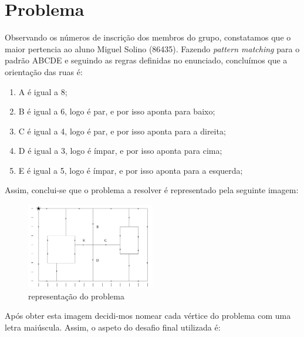 \documentclass[a4paper]{report}
\begin{document}
\chapter{Problema}
Observando os números de inscrição dos membros do grupo, constatamos
que o maior pertencia ao aluno Miguel Solino (86435).
Fazendo \textit{pattern matching} para o padrão ABCDE e seguindo as
regras definidas no enunciado, concluímos que a orientação das ruas é:

\begin{enumerate}
    \item A é igual a 8;
    \item B é igual a 6, logo é par, e por isso aponta para baixo;
    \item C é igual a 4, logo é par, e por isso aponta para a direita;
    \item D é igual a 3, logo é ímpar, e por isso aponta para cima;
    \item E é igual a 5, logo é ímpar, e por isso aponta para a 
        esquerda;
\end{enumerate}
Assim, conclui-se que o problema a resolver é representado pela
seguinte imagem:

\begin{figure}[H]
    \begin{center}
        \includegraphics[width=0.5\textwidth]{images/desafio.png}\par
        \caption{representação do problema}
        \label{fig:problem}
    \end{center}
\end{figure}
Após obter esta imagem decidi-mos nomear cada vértice do problema com
uma letra maiúscula. Assim, o aspeto do desafio final utilizada é:
\end{document}
